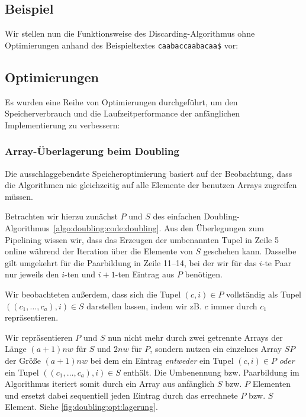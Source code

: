 \subsection{Beispiel}

Wir stellen nun die Funktionsweise des Discarding-Algorithmus ohne Optimierungen anhand des Beispieltextes \texttt{caabaccaabacaa\$} vor:



\subsection{Optimierungen}
\label{algo:doubling:sec:usedoptimizations}

Es wurden eine Reihe von Optimierungen durchgeführt, um den Speicherverbrauch und die Laufzeitperformance der anfänglichen Implementierung zu verbessern:

\subsubsection{Array-Überlagerung beim Doubling} Die ausschlaggebendste Speicheroptimierung basiert auf der Beobachtung, dass die Algorithmen nie gleichzeitig auf alle Elemente der benutzen Arrays zugreifen müssen.

Betrachten wir hierzu zunächst $P$ und $S$ des einfachen Doubling-Algorithmus~\ref{algo:doubling:code:doubling}. Aus den Überlegungen zum Pipelining wissen wir, dass das Erzeugen der umbenannten Tupel in Zeile 5 online während der Iteration über die Elemente von $S$ geschehen kann. Dasselbe gilt umgekehrt für die Paarbildung in Zeile 11--14, bei der wir für das $i$-te Paar nur jeweils den $i$-ten und $i+1$-ten Eintrag aus $P$ benötigen. 

Wir beobachteten außerdem, dass sich die Tupel $(c, i) \in P$ vollständig als Tupel $((c_1, \dots, c_a), i) \in S$ darstellen lassen, indem wir zB. $c$ immer durch $c_1$ repräsentieren.

Wir repräsentieren $P$ und $S$ nun nicht mehr durch zwei getrennte Arrays der Länge $(a + 1)nw$ für $S$ und $2nw$ für $P$, sondern nutzen ein einzelnes Array $SP$ der Größe $(a + 1)nw$  bei dem ein Eintrag \textit{entweder} ein Tupel $(c, i) \in P$ \textit{oder} ein Tupel $((c_1, \dots, c_a), i) \in S$ enthält. Die Umbenennung bzw. Paarbildung im Algorithmus iteriert somit durch ein Array aus anfänglich $S$ bzw. $P$ Elementen und ersetzt dabei sequentiell jeden Eintrag durch das errechnete $P$ bzw. $S$ Element. Siehe \cref{fig:doubling:opt:lagerung}.

